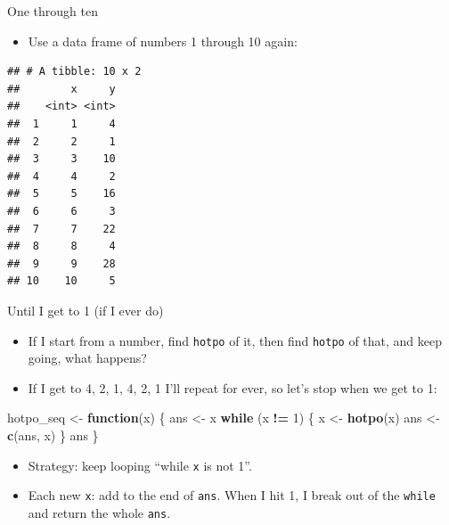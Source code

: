 \documentclass[ignorenonframetext,]{beamer}
\newenvironment{Shaded}{\begin{snugshade}}{\end{snugshade}}
\newcommand{\ControlFlowTok}[1]{\textcolor[rgb]{0.13,0.29,0.53}{\textbf{#1}}}
\newcommand{\DataTypeTok}[1]{\textcolor[rgb]{0.13,0.29,0.53}{#1}}
\newcommand{\DecValTok}[1]{\textcolor[rgb]{0.00,0.00,0.81}{#1}}
\newcommand{\KeywordTok}[1]{\textcolor[rgb]{0.13,0.29,0.53}{\textbf{#1}}}
\newcommand{\NormalTok}[1]{#1}
\newcommand{\OperatorTok}[1]{\textcolor[rgb]{0.81,0.36,0.00}{\textbf{#1}}}
\newcommand{\StringTok}[1]{\textcolor[rgb]{0.31,0.60,0.02}{#1}}
\providecommand{\tightlist}{%
  \setlength{\itemsep}{0pt}\setlength{\parskip}{0pt}}
\begin{document}
\begin{frame}[fragile]{One through ten}
\protect\hypertarget{one-through-ten}{}

\begin{itemize}
\tightlist
\item
  Use a data frame of numbers 1 through 10 again:
\end{itemize}

\begin{Shaded}
\end{Shaded}

\begin{verbatim}
## # A tibble: 10 x 2
##        x     y
##    <int> <int>
##  1     1     4
##  2     2     1
##  3     3    10
##  4     4     2
##  5     5    16
##  6     6     3
##  7     7    22
##  8     8     4
##  9     9    28
## 10    10     5
\end{verbatim}

\end{frame}

\begin{frame}[fragile]{Until I get to 1 (if I ever do)}
\protect\hypertarget{until-i-get-to-1-if-i-ever-do}{}

\begin{itemize}
\tightlist
\item
  If I start from a number, find \texttt{hotpo} of it, then find
  \texttt{hotpo} of that, and keep going, what happens?
\item
  If I get to 4, 2, 1, 4, 2, 1 I'll repeat for ever, so let's stop when
  we get to 1:
\end{itemize}

\begin{Shaded}
\begin{Highlighting}[]
\NormalTok{hotpo_seq <-}\StringTok{ }\ControlFlowTok{function}\NormalTok{(x) \{}
\NormalTok{  ans <-}\StringTok{ }\NormalTok{x}
  \ControlFlowTok{while}\NormalTok{ (x }\OperatorTok{!=}\StringTok{ }\DecValTok{1}\NormalTok{) \{}
\NormalTok{    x <-}\StringTok{ }\KeywordTok{hotpo}\NormalTok{(x)}
\NormalTok{    ans <-}\StringTok{ }\KeywordTok{c}\NormalTok{(ans, x)}
\NormalTok{  \}}
\NormalTok{  ans}
\NormalTok{\}}
\end{Highlighting}
\end{Shaded}

\begin{itemize}
\tightlist
\item
  Strategy: keep looping ``while \texttt{x} is not 1''.
\item
  Each new \texttt{x}: add to the end of \texttt{ans}. When I hit 1, I
  break out of the \texttt{while} and return the whole \texttt{ans}.
\end{itemize}

\end{frame}
\end{document}
